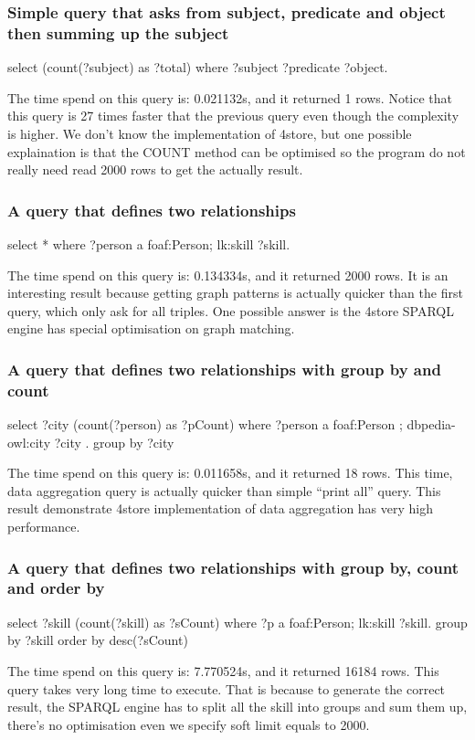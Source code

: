 \subsubsection{Simple query that asks from subject, predicate and object then summing up the subject}
\begin{verbatimtab}
	select (count(?subject) as ?total) where  {
		?subject ?predicate ?object. 
	}
\end{verbatimtab}
The time spend on this query is: 0.021132s, and it returned 1 rows.
Notice that this query is 27 times faster that the previous query even though the complexity is higher. We don't know the implementation of 4store, but one possible explaination is that the COUNT method can be optimised so the program do not really need read 2000 rows to get the actually result.

\subsubsection{A query that defines two relationships}
\begin{verbatimtab}
	select * where {
		?person a foaf:Person;
			lk:skill ?skill.
	}
\end{verbatimtab}
The time spend on this query is: 0.134334s, and it returned 2000 rows.
It is an interesting result because getting graph patterns is actually quicker than the first query, which only ask for all triples. One possible answer is the 4store SPARQL engine has special optimisation on graph matching.

\subsubsection{A query that defines two relationships with group by and count}
\begin{verbatimtab}
	select ?city (count(?person) as ?pCount) where {
		?person a foaf:Person ;
			dbpedia-owl:city ?city .
	} group by ?city
\end{verbatimtab}
The time spend on this query is: 0.011658s, and it returned 18 rows.
This time, data aggregation query is actually quicker than simple ``print all'' query. This result demonstrate 4store implementation of data aggregation has very high performance.

\subsubsection{A query that defines two relationships with group by, count and order by}
\begin{verbatimtab}
	select ?skill (count(?skill) as ?sCount) where{
		?p a foaf:Person;
			lk:skill ?skill.
	} group by ?skill order by desc(?sCount)
\end{verbatimtab}
The time spend on this query is: 7.770524s, and it returned 16184 rows.
This query takes very long time to execute. That is because to generate the correct result, the SPARQL engine has to split all the skill into groups and sum them up, there's no optimisation even we specify soft limit equals to 2000.


